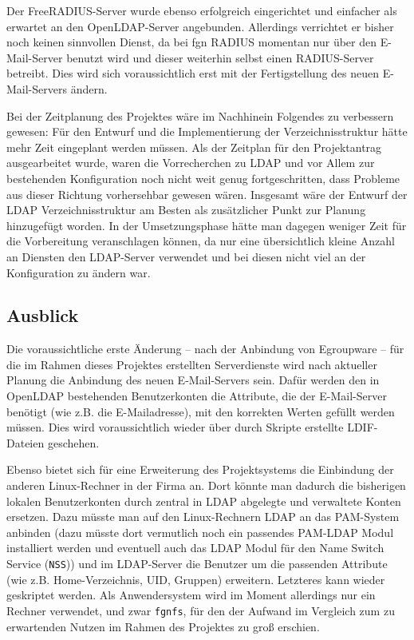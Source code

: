 \documentclass[11pt,a4paper,titlepage=firstiscover,headsepline,bibtotoc]{scrartcl} %
\begin{document}
Der FreeRADIUS-Server wurde ebenso erfolgreich eingerichtet und einfacher als erwartet an den OpenLDAP-Server angebunden. Allerdings verrichtet er bisher noch keinen sinnvollen Dienst, da bei fgn RADIUS momentan nur über den E-Mail-Server benutzt wird und dieser weiterhin selbst einen RADIUS-Server betreibt. Dies wird sich voraussichtlich erst mit der Fertigstellung des neuen E-Mail-Servers ändern.

Bei der Zeitplanung des Projektes wäre im Nachhinein Folgendes zu verbessern gewesen: Für den Entwurf und die Implementierung der Verzeichnisstruktur hätte mehr Zeit eingeplant werden müssen. Als der Zeitplan für den Projektantrag ausgearbeitet wurde, waren die Vorrecherchen zu LDAP und vor Allem zur bestehenden Konfiguration noch nicht weit genug fortgeschritten, dass Probleme aus dieser Richtung vorhersehbar gewesen wären. Insgesamt wäre der Entwurf der LDAP Verzeichnisstruktur am Besten als zusätzlicher Punkt zur Planung hinzugefügt worden. In der Umsetzungsphase hätte man dagegen weniger Zeit für die Vorbereitung veranschlagen können, da nur eine übersichtlich kleine Anzahl an Diensten den LDAP-Server verwendet und bei diesen nicht viel an der Konfiguration zu ändern war.

\subsection{Ausblick}
Die voraussichtliche erste Änderung -- nach der Anbindung von Egroupware -- für die im Rahmen dieses Projektes erstellten Serverdienste wird nach aktueller Planung die Anbindung des neuen E-Mail-Servers sein. Dafür werden den in OpenLDAP bestehenden Benutzerkonten die Attribute, die der E-Mail-Server benötigt (wie z.B. die E-Mailadresse), mit den korrekten Werten gefüllt werden müssen. Dies wird voraussichtlich wieder über durch Skripte erstellte LDIF-Dateien geschehen.

Ebenso bietet sich für eine Erweiterung des Projektsystems die Einbindung der anderen Linux-Rechner in der Firma an. Dort könnte man dadurch die bisherigen lokalen Benutzerkonten durch zentral in LDAP abgelegte und verwaltete Konten ersetzen. Dazu müsste man auf den Linux-Rechnern LDAP an das PAM-System anbinden (dazu müsste dort vermutlich noch ein passendes PAM-LDAP Modul installiert werden und eventuell auch das LDAP Modul für den Name Switch Service (\texttt{NSS})) und im LDAP-Server die Benutzer um die passenden Attribute (wie z.B. Home-Verzeichnis, UID, Gruppen) erweitern. Letzteres kann wieder geskriptet werden. Als Anwendersystem wird im Moment allerdings nur ein Rechner verwendet, und zwar \texttt{fgnfs}, für den der Aufwand im Vergleich zum zu erwartenden Nutzen im Rahmen des Projektes zu groß erschien.
\end{document}
